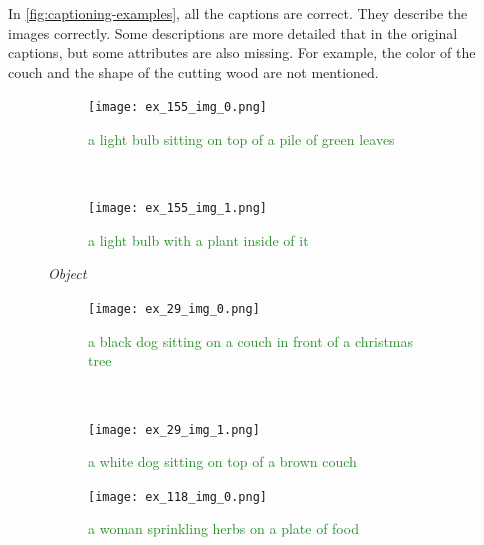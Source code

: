 In \cref{fig:captioning-examples}, all the captions are correct. They describe the images correctly. Some descriptions are more detailed that in the original captions, but some attributes are also missing. For example, the color of the couch and the shape of the cutting wood are not mentioned.

\begin{figure}[ht]
\centering
    \begin{minipage}[t]{.30\textwidth}
        \begin{subfigure}[t]{\textwidth}
        \centering
        \texttt{[image: ex\_155\_img\_0.png]}
        \caption{\textcolor{ForestGreen}{a light bulb sitting on top of a pile of green leaves \cmark}}
        \end{subfigure}\\
        \begin{subfigure}[t]{\textwidth}
        \centering
        \texttt{[image: ex\_155\_img\_1.png]}
        \caption{\textcolor{ForestGreen}{a light bulb with a plant inside of it \cmark}}
        \end{subfigure}%
        \caption*{\textit{Object}}
    \end{minipage}
    \hfill
    \begin{minipage}[t]{.30\textwidth}
        \begin{subfigure}[t]{\textwidth}
        \centering
        \texttt{[image: ex\_29\_img\_0.png]}
        \caption{\textcolor{ForestGreen}{a black dog sitting on a couch in front of a christmas tree \cmark}}
        \end{subfigure}\\
        \begin{subfigure}[t]{\textwidth}
        \centering
        \texttt{[image: ex\_29\_img\_1.png]}
        \caption{\textcolor{ForestGreen}{a white dog sitting on top of a brown couch \cmark}}
        \end{subfigure}%
        \caption*{\textit{Relation}}
    \end{minipage}
    \hfill
    \begin{minipage}[t]{.30\textwidth}
        \begin{subfigure}[t]{\textwidth}
        \centering
        \texttt{[image: ex\_118\_img\_0.png]}
        \caption{\textcolor{ForestGreen}{a woman sprinkling herbs on a plate of food \cmark}}
        \end{subfigure}\\
        \begin{subfigure}[t]{\textwidth}

\end{subfigure}
\end{minipage}
\end{figure}
